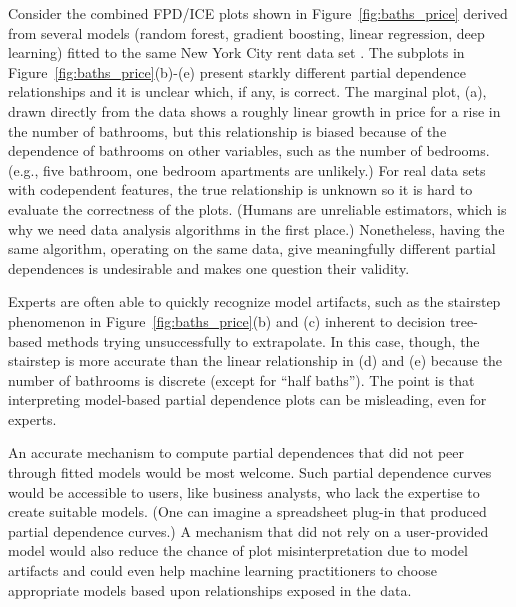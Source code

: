 \documentclass[]{article} %
\newcommand{\figref}[1]{Figure~\ref{#1}}
\begin{document}
Consider the combined FPD/ICE plots shown in \figref{fig:baths_price} derived from several models (random forest, gradient boosting, linear regression, deep learning) fitted to the same New York City rent data set \citep{rent}.  The subplots in \figref{fig:baths_price}(b)-(e)  present starkly different partial dependence relationships and it is unclear which, if any, is correct.  The marginal plot, (a), drawn directly from the data shows a roughly linear growth in price for a rise in the number of bathrooms, but this relationship is biased because of the dependence of bathrooms on other variables, such as the number of bedrooms. (e.g., five bathroom, one bedroom apartments are unlikely.)  For real data sets with codependent features, the true relationship is unknown so it is hard to evaluate the correctness of the plots. (Humans are unreliable estimators, which is why we need data analysis algorithms in the first place.) Nonetheless, having the same algorithm, operating on the same data, give meaningfully different partial dependences is undesirable and makes one question their validity.

Experts are often able to quickly recognize model artifacts, such as the  stairstep phenomenon in \figref{fig:baths_price}(b) and (c) inherent to decision tree-based methods trying unsuccessfully to extrapolate.  In this case, though, the stairstep is more accurate than the linear relationship in (d) and (e) because the number of bathrooms is discrete (except for ``half baths'').  The point is that interpreting model-based partial dependence plots can be misleading, even for experts. 

An accurate mechanism to compute partial dependences that did not peer through fitted models would be most welcome.  Such partial dependence curves would be accessible to users, like business analysts, who lack the expertise to create suitable models. (One can imagine a spreadsheet plug-in that produced partial dependence curves.) A mechanism that did not rely on a user-provided model would also reduce the chance of plot misinterpretation due to model artifacts and could even help machine learning practitioners to choose appropriate models based upon relationships exposed in the data.
\end{document}
